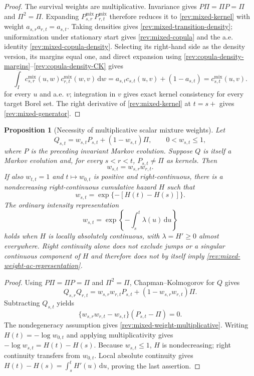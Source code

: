 \documentclass[11pt]{article}
\newtheorem{proposition}[definition]{Proposition}
\theoremstyle{remark}
\newcommand{\dd}{\,\mathrm d}
\begin{document}
\begin{proof}
The survival weights are multiplicative.  Invariance gives
$P\Pi=\Pi P=\Pi$ and $\Pi^2=\Pi$.  Expanding
$P^{\mathrm{mix}}_{s,r}P^{\mathrm{mix}}_{r,t}$ therefore reduces it to
\eqref{rev:mixed-kernel} with weight $a_{s,r}a_{r,t}=a_{s,t}$.
Taking densities gives \eqref{rev:mixed-transition-density}; uniformization
under stationary start gives \eqref{rev:mixed-copula} and
the a.e. identity \eqref{rev:mixed-copula-density}.  Selecting its right-hand
side as the density version, its margins equal one, and direct expansion
using \eqref{rev:copula-density-margins}--\eqref{rev:copula-density-CK} gives
\[
\int_Ic^{\mathrm{mix}}_{s,r}(u,w)c^{\mathrm{mix}}_{r,t}(w,v)\dd w
=a_{s,t}c_{s,t}(u,v)+(1-a_{s,t})
=c^{\mathrm{mix}}_{s,t}(u,v).
\]
for every $u$ and a.e. $v$; integration in $v$ gives exact kernel consistency
for every target Borel set.
The right derivative of \eqref{rev:mixed-kernel} at $t=s+$ gives
\eqref{rev:mixed-generator}.
\end{proof}

\begin{proposition}[Necessity of multiplicative scalar mixture weights]
\label{rev:prop-mixed-weight-necessity}
Let
\[
 Q_{s,t}=w_{s,t}P_{s,t}+(1-w_{s,t})\Pi,
 \qquad 0<w_{s,t}\leq1,
\]
where $P$ is the preceding invariant Markov evolution.  Suppose $Q$ is itself
a Markov evolution and, for every $s<r<t$, $P_{s,t}\ne\Pi$ as kernels.  Then
\begin{equation}
 w_{s,t}=w_{s,r}w_{r,t}.
 \label{rev:mixed-weight-multiplicative}
\end{equation}
If also $w_{t,t}=1$ and $t\mapsto w_{0,t}$ is positive and right-continuous,
there is a nondecreasing right-continuous cumulative hazard $H$ such that
\begin{equation}
 w_{s,t}=\exp\{-[H(t)-H(s)]\}.
 \label{rev:mixed-weight-cumulative-hazard}
\end{equation}
The ordinary intensity representation
\begin{equation}
 w_{s,t}=\exp\!\left\{-\int_s^t\lambda(u)\dd u\right\}
 \label{rev:mixed-weight-ac-representation}
\end{equation}
holds when $H$ is locally absolutely continuous, with
$\lambda=H'\geq0$ almost everywhere.  Right continuity alone does not exclude
jumps or a singular continuous component of $H$ and therefore does not by
itself imply \eqref{rev:mixed-weight-ac-representation}.
\end{proposition}

\begin{proof}
Using $P\Pi=\Pi P=\Pi$ and $\Pi^2=\Pi$, Chapman--Kolmogorov for $Q$ gives
\[
 Q_{s,r}Q_{r,t}=w_{s,r}w_{r,t}P_{s,t}
 +(1-w_{s,r}w_{r,t})\Pi.
\]
Subtracting $Q_{s,t}$ yields
\[
 \{w_{s,r}w_{r,t}-w_{s,t}\}(P_{s,t}-\Pi)=0.
\]
The nondegeneracy assumption gives \eqref{rev:mixed-weight-multiplicative}.
Writing $H(t)=-\log w_{0,t}$ and applying multiplicativity gives
$-\log w_{s,t}=H(t)-H(s)$.  Because $w_{s,t}\leq1$, $H$ is nondecreasing;
right continuity transfers from $w_{0,t}$.  Local absolute continuity gives
$H(t)-H(s)=\int_s^tH'(u)\dd u$, proving the last assertion.
\end{proof}
\end{document}

